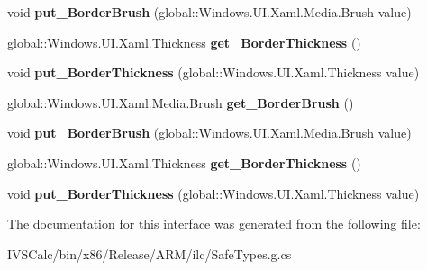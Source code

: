 \begin{DoxyCompactItemize}
\item 
\mbox{\label{interface_windows_1_1_u_i_1_1_xaml_1_1_controls_1_1_i_grid2_af4bf398df0a43ba5b9b4fcd3a31bb58a}} 
void {\bfseries put\+\_\+\+Border\+Brush} (global\+::\+Windows.\+U\+I.\+Xaml.\+Media.\+Brush value)
\item 
\mbox{\label{interface_windows_1_1_u_i_1_1_xaml_1_1_controls_1_1_i_grid2_aa6787459b59d92219e0bfdc4e595ce55}} 
global\+::\+Windows.\+U\+I.\+Xaml.\+Thickness {\bfseries get\+\_\+\+Border\+Thickness} ()
\item 
\mbox{\label{interface_windows_1_1_u_i_1_1_xaml_1_1_controls_1_1_i_grid2_a166919d21dd1a031ab3e7d2edc22938a}} 
void {\bfseries put\+\_\+\+Border\+Thickness} (global\+::\+Windows.\+U\+I.\+Xaml.\+Thickness value)
\item 
\mbox{\label{interface_windows_1_1_u_i_1_1_xaml_1_1_controls_1_1_i_grid2_a8ad45ad9fd4553c6dfdf276b103dd4f5}} 
global\+::\+Windows.\+U\+I.\+Xaml.\+Media.\+Brush {\bfseries get\+\_\+\+Border\+Brush} ()
\item 
\mbox{\label{interface_windows_1_1_u_i_1_1_xaml_1_1_controls_1_1_i_grid2_af4bf398df0a43ba5b9b4fcd3a31bb58a}} 
void {\bfseries put\+\_\+\+Border\+Brush} (global\+::\+Windows.\+U\+I.\+Xaml.\+Media.\+Brush value)
\item 
\mbox{\label{interface_windows_1_1_u_i_1_1_xaml_1_1_controls_1_1_i_grid2_aa6787459b59d92219e0bfdc4e595ce55}} 
global\+::\+Windows.\+U\+I.\+Xaml.\+Thickness {\bfseries get\+\_\+\+Border\+Thickness} ()
\item 
\mbox{\label{interface_windows_1_1_u_i_1_1_xaml_1_1_controls_1_1_i_grid2_a166919d21dd1a031ab3e7d2edc22938a}} 
void {\bfseries put\+\_\+\+Border\+Thickness} (global\+::\+Windows.\+U\+I.\+Xaml.\+Thickness value)
\end{DoxyCompactItemize}


The documentation for this interface was generated from the following file\+:\begin{DoxyCompactItemize}
\item 
I\+V\+S\+Calc/bin/x86/\+Release/\+A\+R\+M/ilc/Safe\+Types.\+g.\+cs\end{DoxyCompactItemize}
